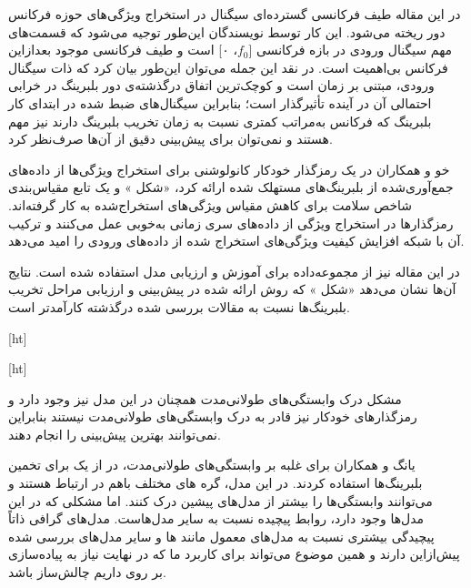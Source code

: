  در این مقاله طیف فرکانسی گسترده‌ای سیگنال در استخراج ویژگی‌های حوزه فرکانس دور ریخته می‌شود. این کار توسط نویسندگان این‌طور توجیه می‌شود که قسمت‌های مهم سیگنال ورودی در بازه فرکانسی [$f_0$، ۰] است و طیف فرکانسی موجود بعدازاین فرکانس بی‌اهمیت است. در نقد این جمله می‌توان این‌طور بیان کرد که ذات سیگنال ورودی، مبتنی بر زمان است و کوچک‌ترین اتفاق درگذشته‌ی دور بلبرینگ در خرابی احتمالی آن در آینده تأثیرگذار است؛ بنابراین سیگنال‌های ضبط شده در ابتدای کار بلبرینگ که فرکانس به‌مراتب کمتری نسبت به زمان تخریب بلبرینگ دارند نیز مهم هستند و نمی‌توان برای پیش‌بینی دقیق از آن‌ها صرف‌نظر کرد.




خو و همکاران در  یک رمزگذار خودکار کانولوشنی برای استخراج ویژگی‌ها از داده‌های جمع‌آوری‌شده از بلبرینگ‌های مستهلک شده ارائه کرد، «شکل » و یک تابع مقیاس‌بندی شاخص سلامت برای کاهش مقیاس ویژگی‌های استخراج‌شده به کار گرفته‌اند. رمزگذارها در استخراج ویژگی از داده‌های سری زمانی به‌خوبی عمل می‌کنند و ترکیب آن با شبکه  افزایش کیفیت ویژگی‌های استخراج شده از داده‌های ورودی را امید می‌دهد.

در این مقاله نیز از مجموعه‌داده  برای آموزش و ارزیابی مدل استفاده شده است. نتایج آن‌ها نشان می‌دهد «شکل » که روش ارائه شده در پیش‌بینی  و ارزیابی مراحل تخریب بلبرینگ‌ها نسبت به مقالات بررسی شده درگذشته کارآمدتر است. 


[ht]



[ht]

مشکل درک وابستگی‌های طولانی‌مدت همچنان در این مدل نیز وجود دارد و رمزگذارهای خودکار نیز قادر به درک وابستگی‌های طولانی‌مدت نیستند بنابراین نمی‌توانند بهترین پیش‌بینی را انجام دهند.



یانگ و همکاران برای غلبه بر وابستگی‌های طولانی‌مدت، در  از یک  برای تخمین  بلبرینگ‌ها استفاده کردند. در این مدل، گره های مختلف باهم در ارتباط هستند و می‌توانند وابستگی‌ها را بیشتر از مدل‌های پیشین درک کنند. اما مشکلی که در این مدل‌ها وجود دارد، روابط پیچیده نسبت به سایر مدل‌هاست. مدل‌های گرافی ذاتاً پیچیدگی بیشتری نسبت به مدل‌های معمول مانند  ها و سایر مدل‌های بررسی شده پیش‌ازاین دارند و همین موضوع می‌تواند برای کاربرد ما که در نهایت نیاز به پیاده‌سازی بر روی  داریم چالش‌ساز باشد.


